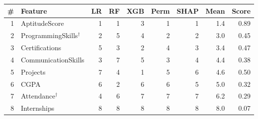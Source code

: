 \footnotesize
\setlength{\tabcolsep}{3pt}
\begin{tabular}{rlrrrrrrr}
\toprule
\# & Feature & LR & RF & XGB & Perm & SHAP & Mean & Score \\
\midrule
1 & AptitudeScore & 1 & 1 & 3 & 1 & 1 & 1.4 & 0.89 \\
2 & ProgrammingSkills$^\dagger$ & 2 & 5 & 4 & 2 & 2 & 3.0 & 0.45 \\
3 & Certifications & 5 & 3 & 2 & 4 & 3 & 3.4 & 0.47 \\
4 & CommunicationSkills & 3 & 7 & 5 & 3 & 4 & 4.4 & 0.38 \\
5 & Projects & 7 & 4 & 1 & 5 & 6 & 4.6 & 0.50 \\
6 & CGPA & 6 & 2 & 6 & 6 & 5 & 5.0 & 0.32 \\
7 & Attendance$^\dagger$ & 4 & 6 & 7 & 7 & 7 & 6.2 & 0.29 \\
8 & Internships & 8 & 8 & 8 & 8 & 8 & 8.0 & 0.07 \\
\bottomrule
\end{tabular}
